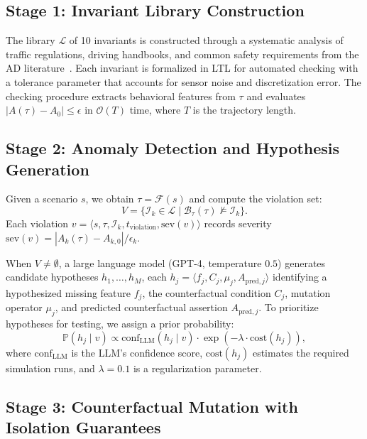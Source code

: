 \documentclass[journal]{IEEEtran}
\theoremstyle{plain}
\newcommand{\invlib}{\mathcal{L}}
\newcommand{\sys}{\mathcal{F}}
\newcommand{\beh}{\mathcal{B}}
\newcommand{\Prob}{\mathbb{P}}
\begin{document}
\subsection{Stage 1: Invariant Library Construction}

The library $\invlib$ of 10 invariants is constructed through a systematic analysis of traffic regulations, driving handbooks, and common safety requirements from the AD literature~\cite{liu2024survey}. Each invariant is formalized in LTL for automated checking with a tolerance parameter that accounts for sensor noise and discretization error. The checking procedure extracts behavioral features from $\tau$ and evaluates $|A(\tau) - A_0| \leq \epsilon$ in $\mathcal{O}(T)$ time, where $T$ is the trajectory length.

\subsection{Stage 2: Anomaly Detection and Hypothesis Generation}

Given a scenario $s$, we obtain $\tau = \sys(s)$ and compute the violation set:
\begin{equation}
V = \{\mathcal{I}_k \in \invlib \mid \beh_{\tau}(\tau) \not\models \mathcal{I}_k\}.
\end{equation}
Each violation $v = \langle s, \tau, \mathcal{I}_k, t_{\text{violation}}, \text{sev}(v) \rangle$ records severity $\text{sev}(v) = |A_k(\tau) - A_{k,0}|/\epsilon_k$.

When $V \neq \emptyset$, a large language model (GPT-4, temperature $0.5$) generates candidate hypotheses $h_1,\dots,h_M$, each $h_j = \langle f_j, C_j, \mu_j, A_{\text{pred},j} \rangle$ identifying a hypothesized missing feature $f_j$, the counterfactual condition $C_j$, mutation operator $\mu_j$, and predicted counterfactual assertion $A_{\text{pred},j}$. To prioritize hypotheses for testing, we assign a prior probability:
\begin{equation}
\Prob(h_j \mid v) \propto \text{conf}_{\text{LLM}}(h_j \mid v) \cdot \exp(-\lambda \cdot \text{cost}(h_j)),
\end{equation}
where $\text{conf}_{\text{LLM}}$ is the LLM's confidence score, $\text{cost}(h_j)$ estimates the required simulation runs, and $\lambda=0.1$ is a regularization parameter.

\subsection{Stage 3: Counterfactual Mutation with Isolation Guarantees}
\end{document}
